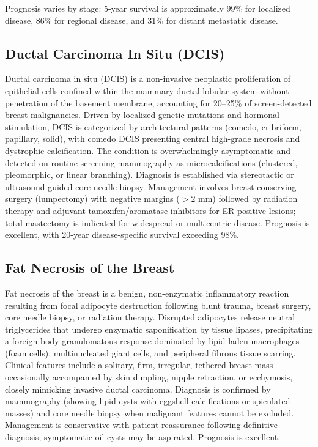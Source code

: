 Prognosis varies by stage: 5-year survival is approximately 99\% for localized disease, 86\% for regional disease, and 31\% for distant metastatic disease.

\subsection{Ductal Carcinoma In Situ (DCIS)}
\label{sec:Ductal Carcinoma In Situ (DCIS)}
Ductal carcinoma in situ (DCIS) is a non-invasive neoplastic proliferation of epithelial cells confined within the mammary ductal-lobular system without penetration of the basement membrane, accounting for 20--25\% of screen-detected breast malignancies. Driven by localized genetic mutations and hormonal stimulation, DCIS is categorized by architectural patterns (comedo, cribriform, papillary, solid), with comedo DCIS presenting central high-grade necrosis and dystrophic calcification. The condition is overwhelmingly asymptomatic and detected on routine screening mammography as microcalcifications (clustered, pleomorphic, or linear branching). Diagnosis is established via stereotactic or ultrasound-guided core needle biopsy. Management involves breast-conserving surgery (lumpectomy) with negative margins ($>2$ mm) followed by radiation therapy and adjuvant tamoxifen/aromatase inhibitors for ER-positive lesions; total mastectomy is indicated for widespread or multicentric disease. Prognosis is excellent, with 20-year disease-specific survival exceeding 98\%.

\subsection{Fat Necrosis of the Breast}
\label{sec:Fat Necrosis of the Breast}
Fat necrosis of the breast is a benign, non-enzymatic inflammatory reaction resulting from focal adipocyte destruction following blunt trauma, breast surgery, core needle biopsy, or radiation therapy. Disrupted adipocytes release neutral triglycerides that undergo enzymatic saponification by tissue lipases, precipitating a foreign-body granulomatous response dominated by lipid-laden macrophages (foam cells), multinucleated giant cells, and peripheral fibrous tissue scarring. Clinical features include a solitary, firm, irregular, tethered breast mass occasionally accompanied by skin dimpling, nipple retraction, or ecchymosis, closely mimicking invasive ductal carcinoma. Diagnosis is confirmed by mammography (showing lipid cysts with eggshell calcifications or spiculated masses) and core needle biopsy when malignant features cannot be excluded. Management is conservative with patient reassurance following definitive diagnosis; symptomatic oil cysts may be aspirated. Prognosis is excellent.

